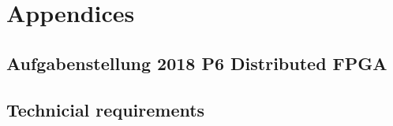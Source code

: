 %
%
\chapter{Appendices}\label{chp:appendices}

\section{Aufgabenstellung 2018 P6 Distributed FPGA} \label{app:aufgabenstellung}


\section{Technicial requirements} \label{app:technicial_requirements}


